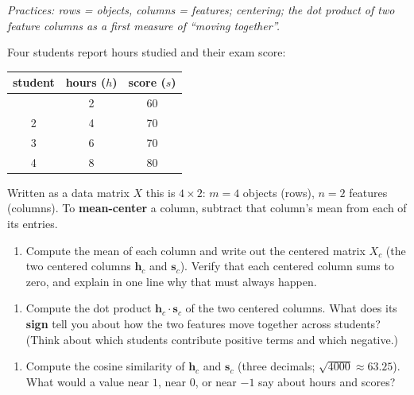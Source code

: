 \documentclass[
  11pt,
]{article}
\newcounter{none} %
\providecommand{\tightlist}{%
  \setlength{\itemsep}{0pt}\setlength{\parskip}{0pt}}
\begin{document}
\emph{Practices: rows = objects, columns = features; centering; the dot
product of two feature columns as a first measure of ``moving
together''.}

Four students report hours studied and their exam score:

{\def\LTcaptype{none} %
\begin{longtable}[]{@{}ccc@{}}
\toprule\noalign{}
student & hours (\(h\)) & score (\(s\)) \\
\midrule\noalign{}
\endhead
\bottomrule\noalign{}
\endlastfoot
1 & 2 & 60 \\
2 & 4 & 70 \\
3 & 6 & 70 \\
4 & 8 & 80 \\
\end{longtable}
}

Written as a data matrix \(X\) this is \(4\times 2\): \(m=4\) objects
(rows), \(n=2\) features (columns). To \textbf{mean-center} a column,
subtract that column's mean from each of its entries.

\begin{enumerate}
\def\labelenumi{(\alph{enumi})}
\tightlist
\item
  Compute the mean of each column and write out the centered matrix
  \(X_c\) (the two centered columns \(\mathbf{h}_c\) and
  \(\mathbf{s}_c\)). Verify that each centered column sums to zero, and
  explain in one line why that must always happen.
\end{enumerate}

\begin{enumerate}
\def\labelenumi{(\alph{enumi})}
\setcounter{enumi}{1}
\tightlist
\item
  Compute the dot product \(\mathbf{h}_c\cdot\mathbf{s}_c\) of the two
  centered columns. What does its \textbf{sign} tell you about how the
  two features move together across students? (Think about which
  students contribute positive terms and which negative.)
\end{enumerate}

\begin{enumerate}
\def\labelenumi{(\alph{enumi})}
\setcounter{enumi}{2}
\tightlist
\item
  Compute the cosine similarity of \(\mathbf{h}_c\) and \(\mathbf{s}_c\)
  (three decimals; \(\sqrt{4000} \approx 63.25\)). What would a value
  near \(1\), near \(0\), or near \(-1\) say about hours and scores?
\end{enumerate}
\end{document}
